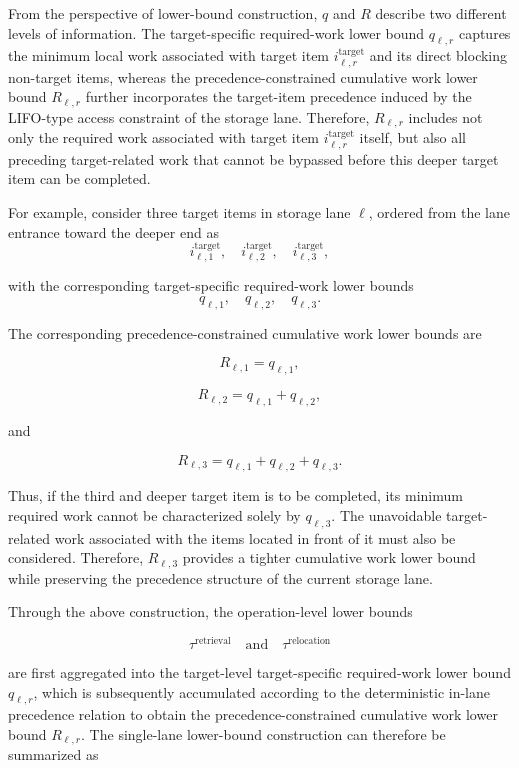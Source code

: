 From the perspective of lower-bound construction, \(q\) and \(R\) describe
two different levels of information. The target-specific required-work lower
bound \(q_{\ell,r}\) captures the minimum local work associated with target item
\(i^{\mathrm{target}}_{\ell,r}\) and its direct blocking non-target items,
whereas the precedence-constrained cumulative work lower bound \(R_{\ell,r}\)
further incorporates the target-item precedence induced by the LIFO-type access
constraint of the storage lane. Therefore, \(R_{\ell,r}\) includes not only
the required work associated with target item \(i^{\mathrm{target}}_{\ell,r}\)
itself, but also all preceding target-related work that cannot be bypassed
before this deeper target item can be completed.

For example, consider three target items in storage lane \(\ell\), ordered from
the lane entrance toward the deeper end as
\[
i^{\mathrm{target}}_{\ell,1},
\quad
i^{\mathrm{target}}_{\ell,2},
\quad
i^{\mathrm{target}}_{\ell,3},
\]

with the corresponding target-specific required-work lower bounds
\[
q_{\ell,1},
\quad
q_{\ell,2},
\quad
q_{\ell,3}.
\]

The corresponding precedence-constrained cumulative work lower bounds are

\[
R_{\ell,1}
=
q_{\ell,1},
\]

\[
R_{\ell,2}
=
q_{\ell,1}
+
q_{\ell,2},
\]

and

\[
R_{\ell,3}
=
q_{\ell,1}
+
q_{\ell,2}
+
q_{\ell,3}.
\]

Thus, if the third and deeper target item is to be completed, its minimum
required work cannot be characterized solely by \(q_{\ell,3}\). The
unavoidable target-related work associated with the items located in front of
it must also be considered. Therefore, \(R_{\ell,3}\) provides a tighter
cumulative work lower bound while preserving the precedence structure of the
current storage lane.

Through the above construction, the operation-level lower bounds

\[
\tau^{\mathrm{retrieval}}
\quad \text{and} \quad
\tau^{\mathrm{relocation}}
\]

are first aggregated into the target-level target-specific required-work lower
bound \(q_{\ell,r}\), which is subsequently accumulated according to the
deterministic in-lane precedence relation to obtain the
precedence-constrained cumulative work lower bound \(R_{\ell,r}\). The
single-lane lower-bound construction can therefore be summarized as

